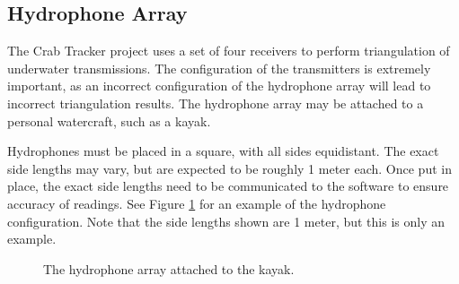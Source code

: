 \documentclass[12pt]{article}
\begin{document}
\subsection{Hydrophone Array}

The Crab Tracker project uses a set of four receivers to perform triangulation
of underwater transmissions.
The configuration of the transmitters is extremely important, as an incorrect
configuration of the hydrophone array will lead to incorrect triangulation
results.
The hydrophone array may be attached to a personal watercraft, such as a kayak.

Hydrophones must be placed in a square, with all sides equidistant.
The exact side lengths may vary, but are expected to be roughly 1 meter
each.
Once put in place, the exact side lengths need to be communicated to the
software to ensure accuracy of readings.
See Figure \ref{fig:array} for an example of the hydrophone configuration.
Note that the side lengths shown are 1 meter, but this is only an example.

\begin{figure}[h]
\begin{center}
\end{center}
\caption{The hydrophone array attached to the kayak.}
\label{fig:array}
\end{figure}
\end{document}
